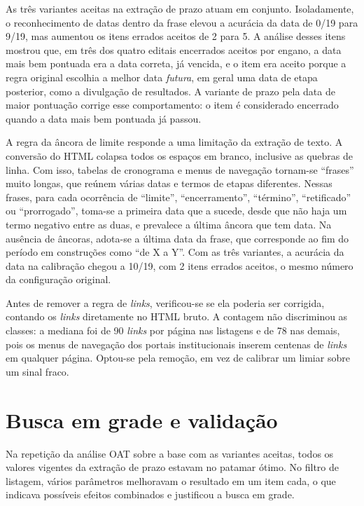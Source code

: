 As três variantes aceitas na extração de prazo atuam em conjunto. Isoladamente,
o reconhecimento de datas dentro da frase elevou a acurácia da data de 0/19
para 9/19, mas aumentou os itens errados aceitos de 2 para 5. A análise desses
itens mostrou que, em três dos quatro editais encerrados aceitos por engano, a
data mais bem pontuada era a data correta, já vencida, e o item era aceito
porque a regra original escolhia a melhor data \emph{futura}, em geral uma data
de etapa posterior, como a divulgação de resultados. A variante de prazo pela
data de maior pontuação corrige esse comportamento: o item é considerado
encerrado quando a data mais bem pontuada já passou.

A regra da âncora de limite responde a uma limitação da extração de texto. A
conversão do HTML colapsa todos os espaços em branco, inclusive as quebras de
linha. Com isso, tabelas de cronograma e menus de navegação tornam-se
``frases'' muito longas, que reúnem várias datas e termos de etapas diferentes.
Nessas frases, para cada ocorrência de ``limite'', ``encerramento'',
``término'', ``retificado'' ou ``prorrogado'', toma-se a primeira data que a
sucede, desde que não haja um termo negativo entre as duas, e prevalece a
última âncora que tem data. Na ausência de âncoras, adota-se a última data da
frase, que corresponde ao fim do período em construções como ``de X a Y''. Com
as três variantes, a acurácia da data na calibração chegou a 10/19, com 2 itens
errados aceitos, o mesmo número da configuração original.

Antes de remover a regra de \textit{links}, verificou-se se ela poderia ser
corrigida, contando os \textit{links} diretamente no HTML bruto. A contagem não
discriminou as classes: a mediana foi de 90 \textit{links} por página nas
listagens e de 78 nas demais, pois os menus de navegação dos portais
institucionais inserem centenas de \textit{links} em qualquer página. Optou-se
pela remoção, em vez de calibrar um limiar sobre um sinal fraco.

\section{Busca em grade e validação}
\label{sec:res_grade}

Na repetição da análise OAT sobre a base com as variantes aceitas, todos os
valores vigentes da extração de prazo estavam no patamar ótimo. No filtro de
listagem, vários parâmetros melhoravam o resultado em um item cada, o que
indicava possíveis efeitos combinados e justificou a busca em grade.

